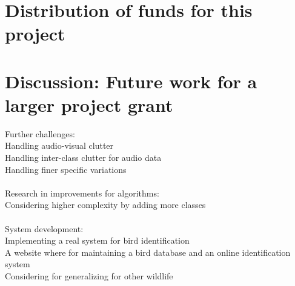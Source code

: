 \documentclass{article}
\begin{document}


\section{Distribution of funds for this project}

\section{Discussion: Future work for a larger project grant}

Further challenges:\\
Handling audio-visual clutter\\
Handling inter-class clutter for audio data\\
Handling finer specific variations \ \\ \ \\
Research in improvements for algorithms:\\
Considering higher complexity by adding more classes \ \\ \ \\
System development:\\
Implementing a real system for bird identification\\
A website where for maintaining a bird database and an online identification system\\
Considering for generalizing for other wildlife\ \\
\end{document}
